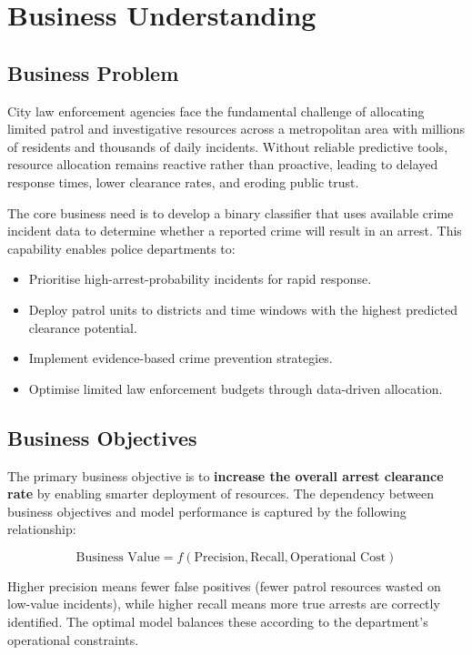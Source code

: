 \section{Business Understanding}
\label{sec:business}

\subsection{Business Problem}

City law enforcement agencies face the fundamental challenge of allocating limited patrol and investigative resources across a metropolitan area with millions of residents and thousands of daily incidents. Without reliable predictive tools, resource allocation remains reactive rather than proactive, leading to delayed response times, lower clearance rates, and eroding public trust.

The core business need is to develop a binary classifier that uses available crime incident data to determine whether a reported crime will result in an arrest. This capability enables police departments to:

\begin{itemize}
    \item Prioritise high-arrest-probability incidents for rapid response.
    \item Deploy patrol units to districts and time windows with the highest predicted clearance potential.
    \item Implement evidence-based crime prevention strategies.
    \item Optimise limited law enforcement budgets through data-driven allocation.
\end{itemize}

\subsection{Business Objectives}

The primary business objective is to \textbf{increase the overall arrest clearance rate} by enabling smarter deployment of resources. The dependency between business objectives and model performance is captured by the following relationship:

\begin{equation}
\text{Business Value} = f(\text{Precision}, \text{Recall}, \text{Operational Cost})
\label{eq:business-value}
\end{equation}

Higher precision means fewer false positives (fewer patrol resources wasted on low-value incidents), while higher recall means more true arrests are correctly identified. The optimal model balances these according to the department's operational constraints.

